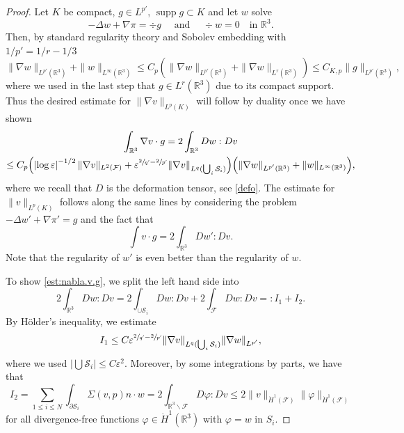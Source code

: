 \documentclass[11pt]{article}
\let\oldbigcup\bigcup
\newcommand{\R}{\mathbb{R}}
\let\eps\varepsilon
\newcommand{\cS}{\mathcal{S}}
\DeclareMathOperator{\supp}{supp}
\theoremstyle{definition}
\theoremstyle{remark}
\begin{document}
\begin{proof}

Let $K$ be compact, $g \in L^{p'}$, $\supp g \subset K$ and let $w$ solve
\begin{equation*}
- \Delta w + \nabla \pi = \div g \quad \text{ and } \quad \div w = 0 \quad \text{in } \R^3.
\end{equation*}
Then, by standard regularity theory and Sobolev embedding with $1/{p'} = 1/r - 1/3$
\begin{equation}
\|\nabla w\|_{L^{p'}(\R^3)} + \|w\|_{L^\infty(\R^3)} \leq C_p (\|\nabla w\|_{L^{p'}(\R^3)} + \|\nabla w\|_{L^{r}(\R^3)}) \leq C_{K,p}\|g\|_{L^{p'}(\R^3)},
\end{equation}
where we used in the last step that $g \in L^r(\R^3)$ due to its compact support.
Thus the desired estimate for $\|\nabla v\|_{L^p(K)}$ will follow by duality once we have shown
\begin{multline} \label{est:nabla.v.g}
\int_{\R^3} \nabla v \cdot g
= 2 \int_{\R^3} D w : D v \\
\leq C_p \Bigl(\left|\log \eps\right|^{-1/2} \|\nabla v\|_{L^2(\mathcal F)} + {\eps^{\sfrac 2 {q'} - \sfrac{2}{p'}} \|\nabla v\|_{L^q(\oldbigcup_i \cS_i)}}\Bigr)
\Bigl(\|\nabla w\|_{L^{p'}(\R^3)} + \|w\|_{L^\infty(\R^3)} \Bigr),
\end{multline}
where we recall that $D$ is the deformation tensor, see \eqref{defo}.
The estimate for $\|v\|_{L^p(K)}$ follows along the same lines by considering the problem $- \Delta w' + \nabla \pi' = g$ and the fact that
\begin{equation*}
\int v \cdot g = 2 \int_{\R^3} D w' : D v.
\end{equation*}
Note that the regularity of $w'$ is even better than the regularity of $w$.

To show \eqref{est:nabla.v.g}, we split the left hand side into
\begin{equation}
2 \int_{\R^3} D w : D v = 2 \int_{\cup \mathcal S_i} D w : D v + 2 \int_{\mathcal F} D w : D v =:I_1 + I_2.
\end{equation}
By Hölder's inequality, we estimate
\begin{equation}
I_1 \leq C {\eps^{\sfrac 2 {q'} - \sfrac{2}{p'}} \|\nabla v\|_{L^q(\oldbigcup_i \cS_i)}} \|\nabla w\|_{L^{p'}},
\end{equation}
where we used $|\bigcup \mathcal S_i| \leq C \eps^2$.
Moreover, by some integrations by parts, we have that
\begin{equation}
I_2 = \sum_{1 \leq i \leq N} \int_{\partial \mathcal S_i} \Sigma(v,p) n \cdot w = 2 \int_{\R^3 \smallsetminus \mathcal F} D \varphi : D v
\leq 2 \|v\|_{\dot H^1(\mathcal F)} \|\varphi\|_{\dot H^1(\mathcal F)}
\end{equation}
for all divergence-free functions $\varphi \in \dot H^1(\R^3)$ with $\varphi = w$ in $S_i$.


\end{proof}
\end{document}
